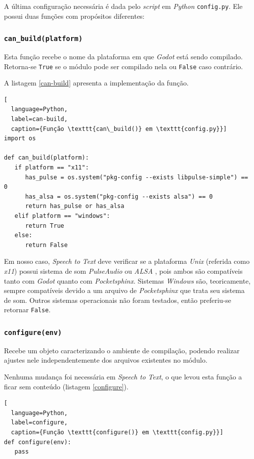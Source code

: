 A última configuração necessária é dada pelo \textit{script} em \textit{Python} \texttt{config.py}. Ele possui duas funções com propósitos diferentes:

\subsubsection{\texttt{can\_build(platform)}}

Esta função recebe o nome da plataforma em que \textit{Godot} está sendo compilado. Retorna-se \texttt{True} se o módulo pode ser compilado nela ou \texttt{False} caso contrário.

A listagem \ref{can-build} apresenta a implementação da função.

\begin{lstlisting}[
  language=Python,
  label=can-build,
  caption={Função \texttt{can\_build()} em \texttt{config.py}}]
import os

def can_build(platform):
   if platform == "x11":
      has_pulse = os.system("pkg-config --exists libpulse-simple") == 0
      has_alsa = os.system("pkg-config --exists alsa") == 0
      return has_pulse or has_alsa
   elif platform == "windows":
      return True
   else:
      return False
\end{lstlisting}

Em nosso caso, \textit{Speech to Text} deve verificar se a plataforma \textit{Unix} (referida como \textit{x11}) possui sistema de som \textit{PulseAudio} \citep{pulseaudio} ou \textit{ALSA} \citep{alsa}, pois ambos são compatíveis tanto com \textit{Godot} quanto com \textit{Pocketsphinx}. Sistemas \textit{Windows} são, teoricamente, sempre compatíveis devido a um arquivo de \textit{Pocketsphinx} que trata seu sistema de som. Outros sistemas operacionais não foram testados, então preferiu-se retornar \texttt{False}.

\subsubsection{\texttt{configure(env)}}

Recebe um objeto caracterizando o ambiente de compilação, podendo realizar ajustes nele independentemente dos arquivos existentes no módulo.

Nenhuma mudança foi necessária em \textit{Speech to Text}, o que levou esta função a ficar sem conteúdo (listagem \ref{configure}).

\begin{lstlisting}[
  language=Python,
  label=configure,
  caption={Função \texttt{configure()} em \texttt{config.py}}]
def configure(env):
   pass
\end{lstlisting}

